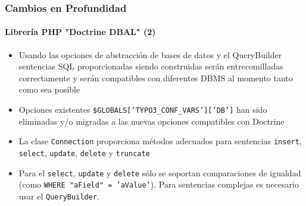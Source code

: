 \begin{frame}[fragile]
	\frametitle{Cambios en Profundidad}
	\framesubtitle{Librería PHP "Doctrine DBAL" (2)}

	\begin{itemize}

		\item Usando las opciones de abstracción de bases de datos y el QueryBuilder
			sentencias SQL proporcionadas siendo construidas serán entrecomilladas correctamente y serán compatibles
			con diferentes DBMS al momento tanto como sea posible

		\item Opciones existentes \texttt{\$GLOBALS['TYPO3\_CONF\_VARS']['DB']} han sido
			eliminadas y/o migradas a las nuevas opciones compatibles con Doctrine

		\item La clase \texttt{Connection} proporciona métodos adecuados para
			sentencias \texttt{insert}, \texttt{select}, \texttt{update}, \texttt{delete} y
			\texttt{truncate}

		\item Para el \texttt{select}, \texttt{update} y \texttt{delete} sólo se soportan comparaciones de igualdad
			(como \texttt{WHERE "aField" = 'aValue'}).
			Para sentencias complejas es necesario usar el \texttt{QueryBuilder}.

	\end{itemize}

\end{frame}


